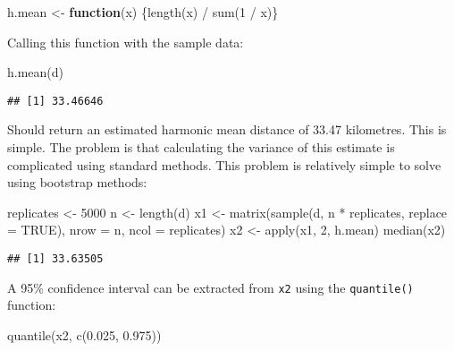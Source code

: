 \documentclass[
  12pt,
  a4paper]{book}
\newenvironment{Shaded}{\begin{snugshade}}{\end{snugshade}}
\newcommand{\AttributeTok}[1]{\textcolor[rgb]{0.77,0.63,0.00}{#1}}
\newcommand{\ConstantTok}[1]{\textcolor[rgb]{0.00,0.00,0.00}{#1}}
\newcommand{\ControlFlowTok}[1]{\textcolor[rgb]{0.13,0.29,0.53}{\textbf{#1}}}
\newcommand{\DecValTok}[1]{\textcolor[rgb]{0.00,0.00,0.81}{#1}}
\newcommand{\FloatTok}[1]{\textcolor[rgb]{0.00,0.00,0.81}{#1}}
\newcommand{\FunctionTok}[1]{\textcolor[rgb]{0.00,0.00,0.00}{#1}}
\newcommand{\NormalTok}[1]{#1}
\newcommand{\OtherTok}[1]{\textcolor[rgb]{0.56,0.35,0.01}{#1}}
\newcommand{\SpecialCharTok}[1]{\textcolor[rgb]{0.00,0.00,0.00}{#1}}
\begin{document}
\begin{Shaded}
\begin{Highlighting}[]
\NormalTok{h.mean }\OtherTok{\textless{}{-}} \ControlFlowTok{function}\NormalTok{(x) \{}\FunctionTok{length}\NormalTok{(x) }\SpecialCharTok{/} \FunctionTok{sum}\NormalTok{(}\DecValTok{1} \SpecialCharTok{/}\NormalTok{ x)\}}
\end{Highlighting}
\end{Shaded}

Calling this function with the sample data:

\begin{Shaded}
\begin{Highlighting}[]
\FunctionTok{h.mean}\NormalTok{(d)}
\end{Highlighting}
\end{Shaded}

\begin{verbatim}
## [1] 33.46646
\end{verbatim}

Should return an estimated harmonic mean distance of 33.47 kilometres. This is simple. The problem is that calculating the variance of this estimate is complicated using standard methods. This problem is relatively simple to solve using bootstrap methods:

\begin{Shaded}
\begin{Highlighting}[]
\NormalTok{replicates }\OtherTok{\textless{}{-}} \DecValTok{5000}
\NormalTok{n }\OtherTok{\textless{}{-}} \FunctionTok{length}\NormalTok{(d)}
\NormalTok{x1 }\OtherTok{\textless{}{-}} \FunctionTok{matrix}\NormalTok{(}\FunctionTok{sample}\NormalTok{(d, n }\SpecialCharTok{*}\NormalTok{ replicates, }\AttributeTok{replace =} \ConstantTok{TRUE}\NormalTok{),}
             \AttributeTok{nrow =}\NormalTok{ n, }\AttributeTok{ncol =}\NormalTok{ replicates)}
\NormalTok{x2 }\OtherTok{\textless{}{-}} \FunctionTok{apply}\NormalTok{(x1, }\DecValTok{2}\NormalTok{, h.mean)}
\FunctionTok{median}\NormalTok{(x2)}
\end{Highlighting}
\end{Shaded}

\begin{verbatim}
## [1] 33.63505
\end{verbatim}

A 95\% confidence interval can be extracted from \texttt{x2} using the \texttt{quantile()} function:

\begin{Shaded}
\begin{Highlighting}[]
\FunctionTok{quantile}\NormalTok{(x2, }\FunctionTok{c}\NormalTok{(}\FloatTok{0.025}\NormalTok{, }\FloatTok{0.975}\NormalTok{))}
\end{Highlighting}
\end{Shaded}
\end{document}

